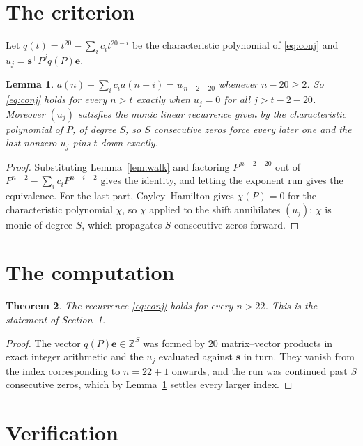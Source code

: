 \documentclass[11pt,a4paper]{article}
\theoremstyle{plain}
\newtheorem{theorem}{Theorem}
\newtheorem{lemma}[theorem]{Lemma}
\theoremstyle{definition}
\begin{document}
\section{The criterion}

Let $q(t)=t^{20}-\sum_i c_i t^{20-i}$ be the characteristic polynomial of
\eqref{eq:conj} and $u_j=\mathbf{s}^{\!\top}P^{j}q(P)\mathbf{e}$.

\begin{lemma}\label{lem:crit}
$a(n)-\sum_i c_i a(n-i)=u_{\,n-2-20}$ whenever $n-20\ge2$. So \eqref{eq:conj}
holds for every $n>t$ exactly when $u_j=0$ for all $j>t-2-20$. Moreover $(u_j)$
satisfies the monic linear recurrence given by the characteristic polynomial of $P$, of
degree $S$, so $S$ consecutive zeros force every later one and the last nonzero $u_j$ pins
$t$ down exactly.
\end{lemma}

\begin{proof}
Substituting Lemma~\ref{lem:walk} and factoring $P^{\,n-2-20}$ out of
$P^{n-2}-\sum_i c_i P^{n-i-2}$ gives the identity, and letting the exponent run gives the
equivalence. For the last part, Cayley--Hamilton gives $\chi(P)=0$ for the characteristic
polynomial $\chi$, so $\chi$ applied to the shift annihilates $(u_j)$; $\chi$ is monic of
degree $S$, which propagates $S$ consecutive zeros forward.
\end{proof}

\section{The computation}

\begin{theorem}
The recurrence \eqref{eq:conj} holds for every $n>22$. This is the statement of
Section~1.
\end{theorem}

\begin{proof}
The vector $q(P)\mathbf{e}\in\mathbb{Z}^{S}$ was formed by $20$ matrix--vector
products in exact integer arithmetic and the $u_j$ evaluated against $\mathbf{s}$ in turn.
They vanish from the index corresponding to $n=22+1$ onwards, and the run was continued
past $S$ consecutive zeros, which by Lemma~\ref{lem:crit} settles every larger index.
\end{proof}

\section{Verification}
\end{document}
